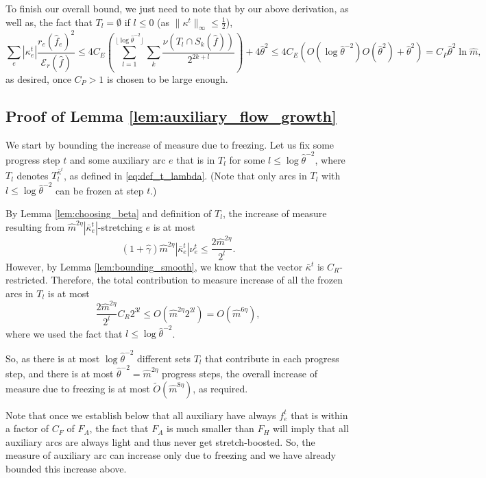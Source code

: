 \documentclass[11pt, letterpaper]{article}
\newcommand{\cendecrease}{C_{P}}
\newcommand{\crestrict}{C_{R}}
\newcommand{\cenergy}{C_{E}}
\newcommand{\fheavy}{F_{H}}
\newcommand{\cfreeze}{C_{F}}
\newcommand{\fauxiliary}{F_{A}}
\newcommand{\floor}[1]{\lfloor #1 \rfloor}
\newcommand{\inorm}[1]{\|#1\|_{\infty}}
\newcommand{\tO}[1]{\widetilde{O}(#1)}
\newcommand{\hm}{\widehat{m}}
\newcommand{\energy}[2]{\mathcal{E}_{#1}(#2)}
\newcommand{\Cset}[2]{S_{#1}(#2)}
\newcommand{\hf}{\hat{f}}
\newcommand{\hgamma}{\hat{\gamma}}
\newcommand{\htheta}{\hat{\theta}}
\newcommand{\okappa}{\bar{\kappa}}
\newcommand{\vnu}{\boldsymbol{\mathit{\nu}}}
\newcommand{\vkappa}{\boldsymbol{\mathit{{\kappa}}}}
\newcommand{\ovkappa}{\boldsymbol{\mathit{\bar{\kappa}}}}
\newcommand{\hff}{\boldsymbol{\mathit{\hat{f}}}}
\newcommand{\rr}{\boldsymbol{\mathit{r}}}
\begin{document}
To finish our overall bound, we just need to note that by our above derivation, as well as, the fact that $T_l=\emptyset$ if $l\leq 0$ (as $\inorm{\vkappa^t}\leq \frac{1}{2}$),
\[
\sum_e  |\kappa_e^t|\frac{r_e (\hf_e)^2}{\energy{\rr}{\hff}}\leq 4\cenergy \left(\sum_{l=1}^{\floor{\log \htheta^{-2}}} \sum_{k} \frac{\vnu(T_l\cap \Cset{k}{\hff})}{2^{2k+l}}\right) + 4 \htheta^2 \leq 4\cenergy\left(O(\log \htheta^{-2}) O(\htheta^2) +\htheta^2\right)=\cendecrease \htheta^2 \ln \hm,
\]
as desired, once $\cendecrease>1$ is chosen to be large enough.

\subsection{Proof of Lemma \ref{lem:auxiliary_flow_growth}}\label{app:auxiliary_flow_growth}

We start by bounding the increase of measure due to freezing. Let us fix some progress step $t$ and some auxiliary arc $e$ that is in $T_{l}$ for some $l\leq \log \htheta^{-2}$, where $T_l$ denotes $T_l^{\ovkappa^t}$, as defined in \eqref{eq:def_t_lambda}. (Note that only arcs in $T_l$ with $l\leq \log \htheta^{-2}$ can be frozen at step $t$.) 

By Lemma \ref{lem:choosing_beta} and definition of $T_l$, the increase of measure resulting from $\hm^{2\eta}|\okappa_e^t|$-stretching $e$ is at most
\[
(1+\hgamma)\hm^{2\eta}|\okappa_e^t| \nu_e^t \leq \frac{2\hm^{2\eta}}{2^l}.
\]
However, by Lemma \ref{lem:bounding_smooth}, we know that the vector $\ovkappa^t$ is $\crestrict$-restricted. Therefore, the total contribution to measure increase of all the frozen arcs in $T_l$ is at most
\[
\frac{2\hm^{2\eta}}{2^l} \crestrict 2^{3l} \leq O(\hm^{2\eta}2^{2l}) = O(\hm^{6\eta}),
\]
where we used the fact that $l\leq \log \htheta^{-2}$. 

So, as there is at most $\log \htheta^{-2}$ different sets $T_l$ that contribute in each progress step, and there is at most $\htheta^{-2}=\hm^{2\eta}$ progress steps, the overall increase of measure due to freezing is at most $\tO{\hm^{8\eta}}$, as required. 

Note that once we establish below that all auxiliary have always $f_e^t$ that is within a factor of $\cfreeze$ of $\fauxiliary$, the fact that $\fauxiliary$ is much smaller than $\fheavy$ will imply that all auxiliary arcs are always light and thus never get stretch-boosted. So, the measure of auxiliary arc can increase only due to freezing and we have already bounded this increase above.
\end{document}
